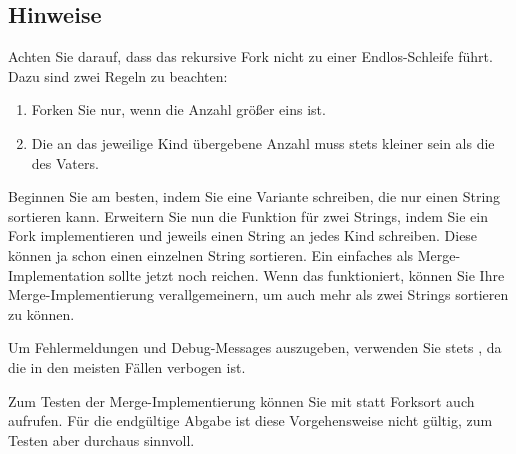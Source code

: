 \subsection*{Hinweise}
Achten Sie darauf, dass das rekursive Fork nicht zu einer Endlos-Schleife führt.
Dazu sind zwei Regeln zu beachten:
\begin{enumerate}
\item Forken Sie nur, wenn die Anzahl größer eins ist.
\item Die an das jeweilige Kind übergebene Anzahl muss stets kleiner sein als
  die des Vaters.
\end{enumerate}
Beginnen Sie am besten, indem Sie eine Variante schreiben, die nur einen String
sortieren kann. Erweitern Sie nun die Funktion für zwei Strings, indem Sie ein
Fork implementieren und jeweils einen String an jedes Kind schreiben. Diese
können ja schon einen einzelnen String sortieren. Ein einfaches
 als Merge-Implementation sollte jetzt noch reichen. Wenn das
funktioniert, können Sie Ihre Merge-Implementierung verallgemeinern, um auch
mehr als zwei Strings sortieren zu können.

Um Fehlermeldungen und Debug-Messages auszugeben, verwenden Sie stets
, da die  in den meisten Fällen verbogen ist.

Zum Testen der Merge-Implementierung können Sie mit  statt
Forksort auch  aufrufen. Für die endgültige Abgabe ist diese
Vorgehensweise nicht gültig, zum Testen aber durchaus sinnvoll.

\osueguidelinestwo



